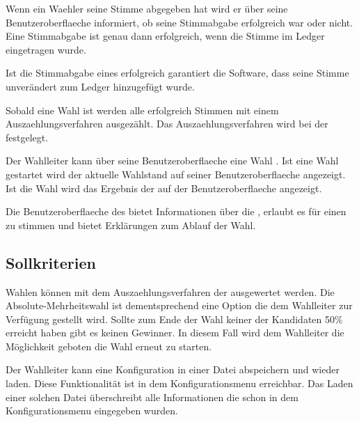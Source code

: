 \documentclass[parskip=full,11pt,twoside]{scrartcl}
\begin{document}
Wenn ein \gls{Waehler} seine \gls{Stimme} abgegeben hat wird er über seine \gls{Benutzeroberflaeche} informiert, ob seine \gls{Stimmabgabe} erfolgreich war oder nicht. Eine \gls{Stimmabgabe} ist genau dann erfolgreich, wenn die \gls{Stimme} im \gls{Ledger} eingetragen wurde.

Ist die \gls{Stimmabgabe} eines  erfolgreich garantiert die Software, dass seine \gls{Stimme} unverändert zum \gls{Ledger} hinzugefügt wurde.

Sobald eine \gls{Wahl}  ist werden alle erfolgreich  Stimmen mit einem \gls{Auszaehlungsverfahren} ausgezählt. Das \gls{Auszaehlungsverfahren} wird bei der  festgelegt.

Der \gls{Wahlleiter} kann über seine \gls{Benutzeroberflaeche} eine Wahl . Ist eine \gls{Wahl} gestartet wird der aktuelle \gls{Wahlstand} auf seiner \gls{Benutzeroberflaeche} angezeigt. Ist die Wahl  wird das Ergebnis der  auf der \gls{Benutzeroberflaeche} angezeigt.

Die \gls{Benutzeroberflaeche} des  bietet Informationen über die , erlaubt es für einen  zu stimmen und bietet Erklärungen zum Ablauf der Wahl.

\subsection{Sollkriterien}

Wahlen können mit dem \gls{Auszaehlungsverfahren} der  ausgewertet werden. Die \gls{Absolute-Mehrheitswahl} ist dementsprechend eine Option die dem \gls{Wahlleiter} zur Verfügung gestellt wird.
Sollte zum Ende der Wahl keiner der Kandidaten 50\% erreicht haben gibt es keinen Gewinner.
In diesem Fall wird dem Wahlleiter die Möglichkeit geboten die Wahl erneut zu starten.

Der \gls{Wahlleiter} kann eine \gls{Konfiguration} in einer Datei abspeichern und wieder laden. Diese Funktionalität ist in dem \gls{Konfigurationsmenu} erreichbar. Das Laden einer solchen Datei überschreibt alle Informationen die schon in dem \gls{Konfigurationsmenu} eingegeben wurden.
\end{document}
